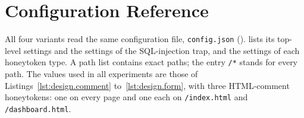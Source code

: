 \documentclass{rptuma}
\begin{document}
\iffalse
\appendix
\chapter{Configuration Reference}
\label{app:config}

All four variants read the same configuration file, \texttt{config.json}
().  lists its top-level settings
and the settings of the SQL-injection trap, and  the settings of
each honeytoken type. A path list contains exact paths; the entry \texttt{/*} stands for every
path. The values used in all experiments are those of
Listings~\ref{lst:design.comment} to~\ref{lst:design.form}, with three HTML-comment honeytokens:
one on every page and one each on \texttt{/index.html} and \texttt{/dashboard.html}.
\end{document}
